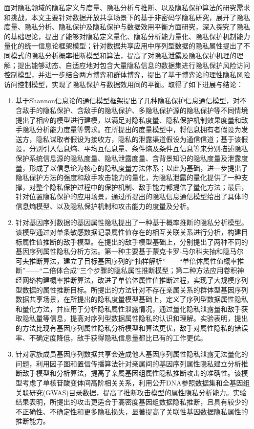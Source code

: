 面对隐私领域的隐私定义与度量、隐私分析与推断、以及隐私保护算法的研究需求和挑战，本文主要针对数据开放共享场景下的基于非密码学隐私研究，展开了隐私度量、隐私分析、隐私保护及隐私保护与数据效用平衡方面研究，深入探究了隐私的基础理论，提出了能够对隐私定义量化、隐私分析能力量化、隐私保护机制能力量化的统一信息论框架模型；针对数据共享应用中序列型数据的隐私属性提出了不同模式的隐私分析概率推断模型和算法，提高了对隐私泄露及隐私保护机理的理解；提出能够动态、自适应地对包含大量隐私信息的数据集进行隐私保护风险访问控制模型，并进一步结合两方博弈和群体博弈，提出了基于博弈论的理性隐私风险访问控制模型，实现了隐私保护与数据效用间的平衡。取得了如下进展与结论：
\begin{enumerate}
	\item 基于Shannon信息论的通信模型框架提出了几种隐私保护信息通信模型，对不含敌手的隐私保护、含敌手的隐私保护、多隐私保护源的隐私保护等不同情境提出了相应的模型进行建模，以满足对隐私度量、隐私保护机制效果度量和敌手隐私分析能力度量等需求。在所提出的度量模型中，将信息拥有者假设为发送方，隐私谋取者假设为接收方，隐私的泄露渠道假设为通信信道；基于该假设，分别引入信息熵、平均互信息量、条件熵及条件互信息等来分别描述隐私保护系统信息源的隐私度量、隐私泄露度量、含背景知识的隐私度量及泄露度量，形成了以信息论为核心的隐私度量方法体系；以此为基础，进一步提出了隐私保护方法的强度和敌手攻击能力的量化，为隐私泄露的量化提供了一种支撑，对整个隐私保护过程中的保护机制、敌手能力都提供了量化方法；最后，针对位置隐私保护的应用场景，通过所提出的隐私信息通信模型给出了具体的信息熵模型、以及隐私保护机制和攻击能力的度量及分析。
	\item 针对基因序列数据的基因属性隐私提出了一种基于概率推断的隐私分析模型。该模型通过对单条敏感数据记录属性值存在的相互关联关系进行分析，构建目标属性值推断的敌手模型。在提出的敌手模型基础上，分别提出了两种不同的基因序列属性隐私分析方法。第一种主要基于蒙克卡罗-马尔科夫抽和隐马尔可夫推断算法，建立了目标基因序列的“抽样解析”——“单倍体属性值概率推断”——“二倍体合成”三个步骤的隐私属性推断模型；第二种方法应用卷积神经网络构建概率推断算法，改进了单倍体属性值推断过程，实现了大规模序列型数据的属性推断目标。所提出的方法针对不存在亲属关系的群体型基因序列数据共享场景，在所提出的隐私度量模型基础上，定义了序列型数据属性隐私和量化方法，并应用于分析隐私属性泄露情况，通过量化隐私泄露量和敌手获取隐私量等信息，提高对序列型数据属性隐私的认识和理解。实验表明，提出的方法比现有基因序列属性隐私分析模型和算法更优，敌手对属性隐私的错误率、不确定度降低，敌手获得隐私信息量都比已有的工作更优。
	\item 针对家族成员基因序列数据共享会造成他人基因序列属性隐私泄露无法量化的问题，利用因子图和置信传播算法针对亲属间的基因序列属性隐私建立分析推断敌手模型和分析算法，提高了亲属基因组属性隐私推断攻击的准确性。该模型考虑了单核苷酸变体间高阶相关关系，利用公开DNA参照数据集和全基因组关联研究(GWAS)目录数据，提高了推断攻击模型的属性隐私分析能力。实验结果表明，所提出的攻击更适合于高密度基因组数据隐私推断，且具有较少的不正确性、不确定性和更多隐私损失，显著提高了关联性基因数据隐私属性的推断能力。

\end{enumerate}
